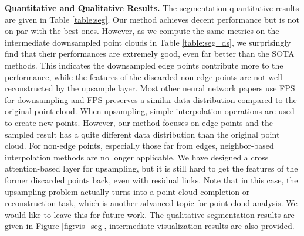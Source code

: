 \documentclass[10pt,twocolumn,letterpaper]{article}
\begin{document}
\begin{table}[ht]
\centering
{}
\caption{Segmentation results of the full point clouds and intermediate downsampled point clouds of different sizes.}
\label{table:seg_ds}
\end{table}

\textbf{Quantitative and Qualitative Results.}
The segmentation quantitative results are given in Table \ref{table:seg}. Our method achieves decent performance but is not on par with the best ones. However, as we compute the same metrics on the intermediate downsampled point clouds in Table \ref{table:seg_ds}, we surprisingly find that their performances are extremely good, even far better than the SOTA methods. This indicates the downsampled edge points contribute more to the performance, while the features of the discarded non-edge points are not well reconstructed by the upsample layer.
Most other neural network papers use FPS for downsampling and FPS preserves a similar data distribution compared to the original point cloud. When upsampling, simple interpolation operations \cite{Qi2017PointNetDH, Zhao2021PointT, Lai2022StratifiedTF} are used to create new points.
However, our method focuses on edge points and the sampled result has a quite different data distribution than the original point cloud. 
For non-edge points, especially those far from edges, neighbor-based interpolation methods are no longer applicable.
We have designed a cross attention-based layer for upsampling, but it is still hard to get the features of the former discarded points back, even with residual links. 
Note that in this case, the upsampling problem actually turns into a point cloud completion or reconstruction task, which is another advanced topic for point cloud analysis. We would like to leave this for future work. The qualitative segmentation results are given in Figure \ref{fig:vis_seg}, intermediate visualization 
results are also provided.
\end{document}
